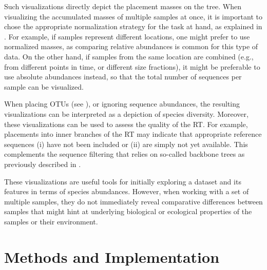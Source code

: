 Such visualizations directly depict the placement masses on the tree.
When visualizing the accumulated masses of multiple samples at once,
it is important to chose the appropriate normalization strategy for the task at hand,
as explained in .
For example, if samples represent different locations, one might prefer to use normalized masses,
as comparing relative abundances is common for this type of data.
On the other hand, if samples from the same location are combined
(e.g., from different points in time, or different size fractions),
it might be preferable to use absolute abundances instead,
so that the total number of sequences per sample can be visualized.

When placing OTUs (see ),
or ignoring sequence abundances, the resulting visualizations can be interpreted as a depiction of species diversity.
Moreover, these visualizations can be used to assess the quality of the \ac{RT}.
For example, placements into inner branches of the \ac{RT} may indicate that appropriate reference sequences
(i) have not been included or (ii) are simply not yet available.
This complements the sequence filtering that relies on so-called backbone trees
as previously described in .

These visualizations are useful tools for initially exploring a dataset and its features
in terms of species abundances.
However, when working with a set of multiple samples,
they do not immediately reveal comparative differences between samples
that might hint at underlying biological or ecological properties of the samples or their environment.


\section{Methods and Implementation}
\label{ch:Visualization:sec:Methods}

